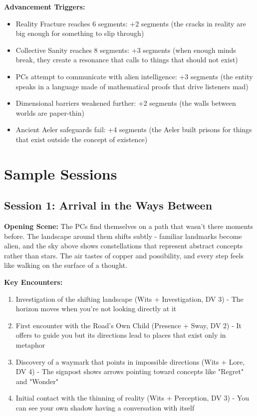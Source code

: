 \documentclass[11pt]{article}
\begin{document}
\textbf{Advancement Triggers:}
\begin{itemize}
\item Reality Fracture reaches 6 segments: +2 segments (the cracks in reality are big enough for something to slip through)
\item Collective Sanity reaches 8 segments: +3 segments (when enough minds break, they create a resonance that calls to things that should not exist)
\item PCs attempt to communicate with alien intelligence: +3 segments (the entity speaks in a language made of mathematical proofs that drive listeners mad)
\item Dimensional barriers weakened further: +2 segments (the walls between worlds are paper-thin)
\item Ancient Aeler safeguards fail: +4 segments (the Aeler built prisons for things that exist outside the concept of existence)
\end{itemize}

\section{Sample Sessions}

\subsection{Session 1: Arrival in the Ways Between}

\textbf{Opening Scene:} The PCs find themselves on a path that wasn't there moments before. The landscape around them shifts subtly - familiar landmarks become alien, and the sky above shows constellations that represent abstract concepts rather than stars. The air tastes of copper and possibility, and every step feels like walking on the surface of a thought.

\textbf{Key Encounters:}
\begin{enumerate}
\item Investigation of the shifting landscape (Wits + Investigation, DV 3) - The horizon moves when you're not looking directly at it
\item First encounter with the Road's Own Child (Presence + Sway, DV 2) - It offers to guide you but its directions lead to places that exist only in metaphor
\item Discovery of a waymark that points in impossible directions (Wits + Lore, DV 4) - The signpost shows arrows pointing toward concepts like "Regret" and "Wonder"
\item Initial contact with the thinning of reality (Wits + Perception, DV 3) - You can see your own shadow having a conversation with itself
\end{enumerate}
\end{document}
